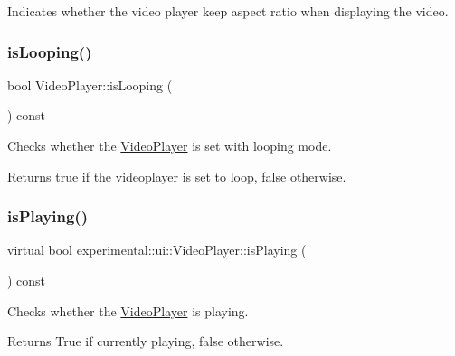 Indicates whether the video player keep aspect ratio when displaying the video. \mbox{\label{classexperimental_1_1ui_1_1VideoPlayer_a8b375ef4829ef04e022a9e7d0ada24aa}} 
\subsubsection{\texorpdfstring{is\+Looping()}{isLooping()}}
{\footnotesize\ttfamily bool Video\+Player\+::is\+Looping (\begin{DoxyParamCaption}{ }\end{DoxyParamCaption}) const\hspace{0.3cm}{\ttfamily [virtual]}}

Checks whether the \hyperlink{classexperimental_1_1ui_1_1VideoPlayer}{Video\+Player} is set with looping mode.

\begin{DoxyReturn}{Returns}
true if the videoplayer is set to loop, false otherwise. 
\end{DoxyReturn}
\mbox{\label{classexperimental_1_1ui_1_1VideoPlayer_a7b1ec8be02ad13696249b75e589586fc}} 
\subsubsection{\texorpdfstring{is\+Playing()}{isPlaying()}\hspace{0.1cm}{\footnotesize\ttfamily [1/2]}}
{\footnotesize\ttfamily virtual bool experimental\+::ui\+::\+Video\+Player\+::is\+Playing (\begin{DoxyParamCaption}{ }\end{DoxyParamCaption}) const\hspace{0.3cm}{\ttfamily [virtual]}}

Checks whether the \hyperlink{classexperimental_1_1ui_1_1VideoPlayer}{Video\+Player} is playing.

\begin{DoxyReturn}{Returns}
True if currently playing, false otherwise. 
\end{DoxyReturn}
\mbox{\label{classexperimental_1_1ui_1_1VideoPlayer_acc07be3ef6a4b2b639f9eb44d8c8f7d1}} 
